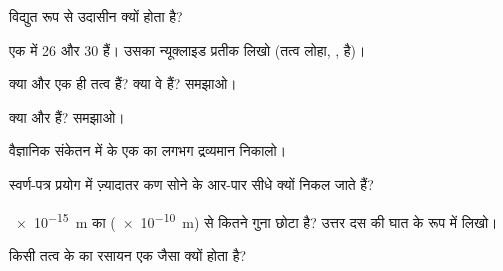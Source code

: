 \begin{exercise}[$\star$]\label{exo:g9:inside-the-atom:3}
 विद्युत रूप से उदासीन क्यों होता है?
\end{exercise}

\begin{exercise}[$\star$]\label{exo:g9:inside-the-atom:4}
एक  में 26  और 30  हैं। उसका न्यूक्लाइड प्रतीक लिखो
(तत्व लोहा, , है)।
\end{exercise}

\begin{exercise}[$\star\star$]\label{exo:g9:inside-the-atom:5}
क्या  और  एक ही तत्व हैं? क्या वे
 हैं? समझाओ।
\end{exercise}

\begin{exercise}[$\star\star$]\label{exo:g9:inside-the-atom:6}
क्या  और   हैं? समझाओ।
\end{exercise}

\begin{exercise}[$\star\star$]\label{exo:g9:inside-the-atom:7}
वैज्ञानिक संकेतन में  के एक  का लगभग द्रव्यमान
निकालो।
\end{exercise}

\begin{exercise}[$\star\star$]\label{exo:g9:inside-the-atom:8}
स्वर्ण-पत्र प्रयोग में ज़्यादातर कण सोने के आर-पार सीधे क्यों निकल
जाते हैं?
\end{exercise}

\begin{exercise}[$\star\star$]\label{exo:g9:inside-the-atom:9}
\qty{e-15}{m} का   (\qty{e-10}{m}) से कितने गुना छोटा
है? उत्तर दस की घात के रूप में लिखो।
\end{exercise}

\begin{exercise}[$\star\star$]\label{exo:g9:inside-the-atom:10}
किसी तत्व के  का रसायन एक जैसा क्यों होता है?
\end{exercise}

